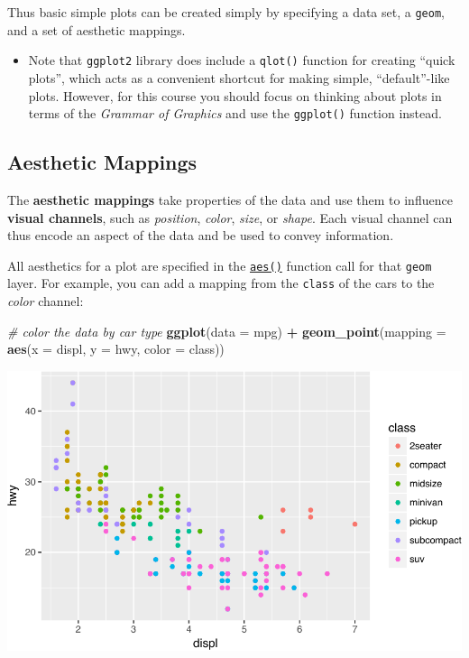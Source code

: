 \documentclass[]{book}
\newenvironment{Shaded}{\begin{snugshade}}{\end{snugshade}}
\newcommand{\KeywordTok}[1]{\textcolor[rgb]{0.13,0.29,0.53}{\textbf{#1}}}
\newcommand{\DataTypeTok}[1]{\textcolor[rgb]{0.13,0.29,0.53}{#1}}
\newcommand{\StringTok}[1]{\textcolor[rgb]{0.31,0.60,0.02}{#1}}
\newcommand{\CommentTok}[1]{\textcolor[rgb]{0.56,0.35,0.01}{\textit{#1}}}
\newcommand{\OperatorTok}[1]{\textcolor[rgb]{0.81,0.36,0.00}{\textbf{#1}}}
\newcommand{\NormalTok}[1]{#1}
\providecommand{\tightlist}{%
  \setlength{\itemsep}{0pt}\setlength{\parskip}{0pt}}
\theoremstyle{definition}
\theoremstyle{definition}
\theoremstyle{remark}
\begin{document}
Thus basic simple plots can be created simply by specifying a data set,
a \texttt{geom}, and a set of aesthetic mappings.

\begin{itemize}
\tightlist
\item
  Note that \texttt{ggplot2} library does include a \texttt{qlot()}
  function for creating ``quick plots'', which acts as a convenient
  shortcut for making simple, ``default''-like plots. However, for this
  course you should focus on thinking about plots in terms of the
  \emph{Grammar of Graphics} and use the \texttt{ggplot()} function
  instead.
\end{itemize}

\subsection{Aesthetic Mappings}\label{aesthetic-mappings}

The \textbf{aesthetic mappings} take properties of the data and use them
to influence \textbf{visual channels}, such as \emph{position},
\emph{color}, \emph{size}, or \emph{shape}. Each visual channel can thus
encode an aspect of the data and be used to convey information.

All aesthetics for a plot are specified in the
\href{http://ggplot2.tidyverse.org/reference/index.html\#section-aesthetics}{\texttt{aes()}}
function call for that \texttt{geom} layer. For example, you can add a
mapping from the \texttt{class} of the cars to the \emph{color} channel:

\begin{Shaded}
\begin{Highlighting}[]
\CommentTok{# color the data by car type}
\KeywordTok{ggplot}\NormalTok{(}\DataTypeTok{data =}\NormalTok{ mpg) }\OperatorTok{+}
\StringTok{  }\KeywordTok{geom_point}\NormalTok{(}\DataTypeTok{mapping =} \KeywordTok{aes}\NormalTok{(}\DataTypeTok{x =}\NormalTok{ displ, }\DataTypeTok{y =}\NormalTok{ hwy, }\DataTypeTok{color =}\NormalTok{ class))}
\end{Highlighting}
\end{Shaded}

\includegraphics{img/ggplot2/aes_color-1.pdf}
\end{document}
